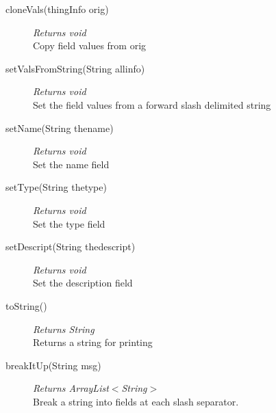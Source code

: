 \documentclass[11pt,a4paper]{article}
\newenvironment{di}
{\begin{flushright}
\begin{minipage}{0.95\textwidth}
\begin{description}
}
{\end{description}
\end{minipage}
\end{flushright}
}
\begin{document}
\begin{di}
\item[{cloneVals(thingInfo orig)}]\emph{Returns void}\\
Copy field values from orig\\
\item[{setValsFromString(String allinfo)}]\emph{Returns void}\\
Set the field values from a forward slash delimited string\\
\item[{setName(String thename)}]\emph{Returns void}\\
Set the name field\\
\item[{setType(String thetype)}]\emph{Returns void}\\
Set the type field\\
\item[{setDescript(String thedescript)}]\emph{Returns void}\\
Set the description field\\
\item[{toString()}]\emph{Returns String}\\
Returns a string for printing\\
\item[{breakItUp(String msg)}]\emph{Returns ArrayList$<$String$>$}\\
Break a string into fields at each slash separator.\\
\end{di}
\end{document}

